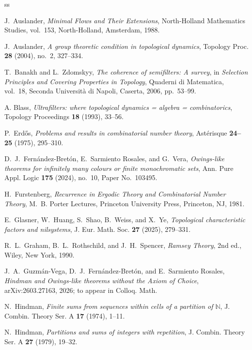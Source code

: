 \documentclass[reqno,12pt]{amsart}
\numberwithin{equation}{section}
\begin{document}
\begin{thebibliography}{ss}

J.~Auslander,
\emph{Minimal Flows and Their Extensions},
North-Holland Mathematics Studies, vol.~153,
North-Holland, Amsterdam, 1988.

J.~Auslander,
\emph{A group theoretic condition in topological dynamics},
Topology Proc. \textbf{28} (2004), no.~2, 327--334.

T.~Banakh and L.~Zdomskyy,
\emph{The coherence of semifilters: A survey},
in \emph{Selection Principles and Covering Properties in Topology},
Quaderni di Matematica, vol.~18,
Seconda Universit\`a di Napoli, Caserta, 2006, pp.~53--99.

A. Blass,
\emph{Ultrafilters: where topological dynamics = algebra = combinatorics},
Topology Proceedings \textbf{18} (1993), 33--56.

P.~Erd{\H{o}}s,
\emph{Problems and results in combinatorial number theory},
Ast\'erisque \textbf{24--25} (1975), 295--310.

D.~J.~Fern\'andez-Bret\'on, E.~Sarmiento Rosales, and G.~Vera,
\emph{Owings-like theorems for infinitely many colours or finite
monochromatic sets},
Ann. Pure Appl. Logic \textbf{175} (2024), no.~10,
Paper No.~103495.

H.~Furstenberg,
\emph{Recurrence in Ergodic Theory and Combinatorial Number Theory},
M.~B. Porter Lectures,
Princeton University Press, Princeton, NJ, 1981.

E.~Glasner, W.~Huang, S.~Shao, B.~Weiss, and X.~Ye,
\emph{Topological characteristic factors and nilsystems},
J. Eur. Math. Soc. \textbf{27} (2025), 279--331.

R.~L.~Graham, B.~L.~Rothschild, and J.~H.~Spencer,
\emph{Ramsey Theory},
2nd ed., Wiley, New York, 1990.

J.~A.~Guzm\'an-Vega, D.~J.~Fern\'andez-Bret\'on, and
E.~Sarmiento Rosales,
\emph{Hindman and Owings-like theorems without the Axiom of Choice},
arXiv:2603.27163, 2026; to appear in Colloq. Math.

N.~Hindman,
\emph{Finite sums from sequences within cells of a partition of
$\mathbb{N}$},
J. Combin. Theory Ser. A \textbf{17} (1974), 1--11.

N.~Hindman,
\emph{Partitions and sums of integers with repetition},
J. Combin. Theory Ser. A \textbf{27} (1979), 19--32.


\end{thebibliography}
\end{document}
